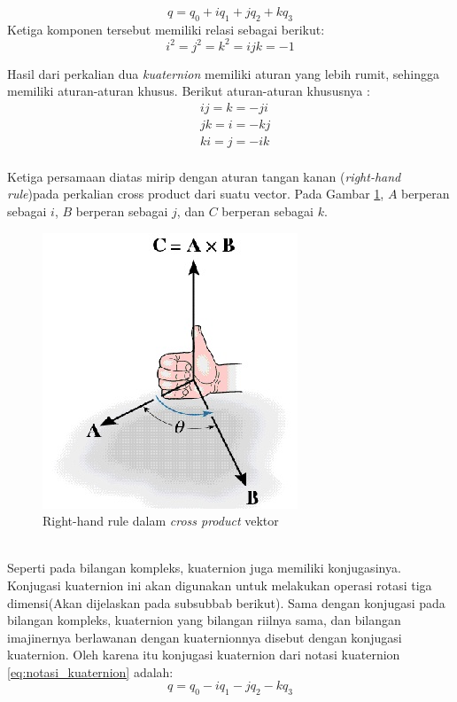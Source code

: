 \begin{equation}
	q = q_0 + i q_1 + j q_2 + k q_3	
\label{eq:notasi_kuaternion}
\end{equation}
Ketiga komponen tersebut memiliki relasi sebagai berikut:
\[
	i^2 = j^2 = k^2 = ijk = -1
\]

Hasil dari perkalian dua \textit{kuaternion} memiliki aturan yang lebih rumit, sehingga memiliki aturan-aturan khusus. Berikut aturan-aturan khususnya :
\begin{equation}
	\begin{split}
	& ij = k = -ji\\
	& jk = i = -kj\\
	& ki = j = -ik	
	\end{split}
\label{eq:persamaan_khusus_aturan_quaternion}
\end{equation}\\
Ketiga persamaan diatas mirip dengan aturan tangan kanan (\textit{right-hand rule})pada perkalian cross product dari suatu vector. Pada Gambar \ref{fig:right-hand-rule}, \(A\) berperan sebagai \(i\), \(B\) berperan sebagai \(j\), dan \(C\) berperan sebagai \(k\).\\
\begin{figure}[htbp]
\centering
\includegraphics[scale=1]{Gambar/right-hand-rule}
\caption{Right-hand rule dalam \textit{cross product} vektor} 
\label{fig:right-hand-rule}
\end{figure}\\

Seperti pada bilangan kompleks, kuaternion juga memiliki konjugasinya. Konjugasi kuaternion ini akan digunakan untuk melakukan operasi rotasi tiga dimensi(Akan dijelaskan pada subsubbab berikut). Sama dengan konjugasi pada bilangan kompleks, kuaternion yang bilangan riilnya sama, dan bilangan imajinernya berlawanan dengan kuaternionnya disebut dengan konjugasi kuaternion. Oleh karena itu konjugasi kuaternion dari notasi kuaternion \ref{eq:notasi_kuaternion} adalah: 
\[
	q = q_0 - i q_1 - j q_2 - k q_3
\]
